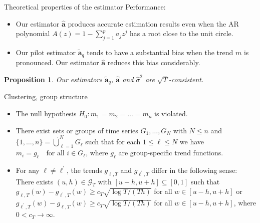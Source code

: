 \documentclass[10pt]{beamer}
\newtheorem{prop}{Proposition}
\begin{document}
\begin{frame}{Theoretical properties of the estimator}
Performance:
\begin{itemize}
\item Our estimator $\widehat{\boldsymbol{a}}$ produces accurate estimation results even when the AR polynomial $A(z) = 1 - \sum_{j=1}^p a_j z^j$ has a root close to the unit circle.\pause
\item Our pilot estimator $\widetilde{\boldsymbol{a}}_q$ tends to have a substantial bias when the trend $m$ is pronounced. Our estimator $\widehat{\boldsymbol{a}}$ reduces this bias considerably.\pause
\end{itemize}
\begin{prop}{}
Our estimators $\widetilde{\boldsymbol{a}}_q$, $\widehat{\boldsymbol{a}}$ and $\widehat{\sigma}^2$ are $\sqrt{T}$-consistent. 
\end{prop}
\end{frame}



\begin{frame}{Clustering, group structure}
\begin{itemize}
\item The null hypothesis $H_0: m_1 = m_2 = \ldots = m_n$ is violated.\pause
\item There exist sets or groups of time series $G_1,\ldots,G_N$ with $N \le n$ and $\{1,\ldots,n\} = \mathbin{\dot{\bigcup}}_{\ell=1}^{N} G_\ell$ such that for each $1 \le \ell \le N$ we have $m_i = g_\ell \quad \text{for all } i \in G_\ell$, where $g_\ell$ are group-specific trend functions.\pause
\item For any $\ell \ne \ell^\prime$, the trends $g_{\ell,T}$ and $g_{\ell^\prime,T}$ differ in the following sense: There exists $(u,h) \in \mathcal{G}_T$ with $[u-h,u+h] \subseteq [0,1]$ such that $g_{\ell,T}(w) - g_{\ell^\prime,T}(w) \ge c_T \sqrt{\log T/(Th)}$ for all $w \in [u-h,u+h]$ or $g_{\ell^\prime,T}(w) - g_{\ell,T}(w) \ge c_T \sqrt{\log T/(Th)}$ for all $w \in [u-h,u+h]$, where $0 < c_T \rightarrow \infty$.
\end{itemize}
\end{frame}
\end{document}
